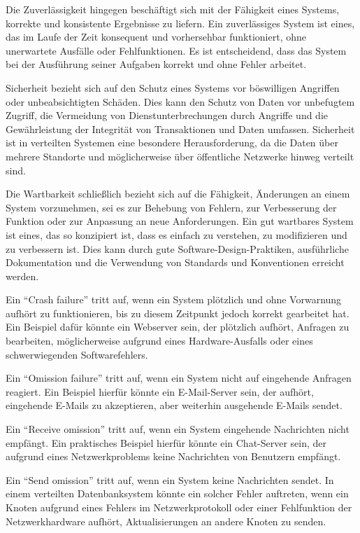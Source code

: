 Die Zuverlässigkeit hingegen beschäftigt sich mit der Fähigkeit eines Systems, korrekte und konsistente Ergebnisse zu liefern. Ein zuverlässiges System ist eines, das im Laufe der Zeit konsequent und vorhersehbar funktioniert, ohne unerwartete Ausfälle oder Fehlfunktionen. Es ist entscheidend, dass das System bei der Ausführung seiner Aufgaben korrekt und ohne Fehler arbeitet.

Sicherheit bezieht sich auf den Schutz eines Systems vor böswilligen Angriffen oder unbeabsichtigten Schäden. Dies kann den Schutz von Daten vor unbefugtem Zugriff, die Vermeidung von Dienstunterbrechungen durch Angriffe und die Gewährleistung der Integrität von Transaktionen und Daten umfassen. Sicherheit ist in verteilten Systemen eine besondere Herausforderung, da die Daten über mehrere Standorte und möglicherweise über öffentliche Netzwerke hinweg verteilt sind.

Die Wartbarkeit schließlich bezieht sich auf die Fähigkeit, Änderungen an einem System vorzunehmen, sei es zur Behebung von Fehlern, zur Verbesserung der Funktion oder zur Anpassung an neue Anforderungen. Ein gut wartbares System ist eines, das so konzipiert ist, dass es einfach zu verstehen, zu modifizieren und zu verbessern ist. Dies kann durch gute Software-Design-Praktiken, ausführliche Dokumentation und die Verwendung von Standards und Konventionen erreicht werden.


Ein \enquote{Crash failure} tritt auf, wenn ein System plötzlich und ohne Vorwarnung aufhört zu funktionieren, bis zu diesem Zeitpunkt jedoch korrekt gearbeitet hat. Ein Beispiel dafür könnte ein Webserver sein, der plötzlich aufhört, Anfragen zu bearbeiten, möglicherweise aufgrund eines Hardware-Ausfalls oder eines schwerwiegenden Softwarefehlers.

Ein \enquote{Omission failure} tritt auf, wenn ein System nicht auf eingehende Anfragen reagiert. Ein Beispiel hierfür könnte ein E-Mail-Server sein, der aufhört, eingehende E-Mails zu akzeptieren, aber weiterhin ausgehende E-Mails sendet.

Ein \enquote{Receive omission} tritt auf, wenn ein System eingehende Nachrichten nicht empfängt. Ein praktisches Beispiel hierfür könnte ein Chat-Server sein, der aufgrund eines Netzwerkproblems keine Nachrichten von Benutzern empfängt.

Ein \enquote{Send omission} tritt auf, wenn ein System keine Nachrichten sendet. In einem verteilten Datenbanksystem könnte ein solcher Fehler auftreten, wenn ein Knoten aufgrund eines Fehlers im Netzwerkprotokoll oder einer Fehlfunktion der Netzwerkhardware aufhört, Aktualisierungen an andere Knoten zu senden.

